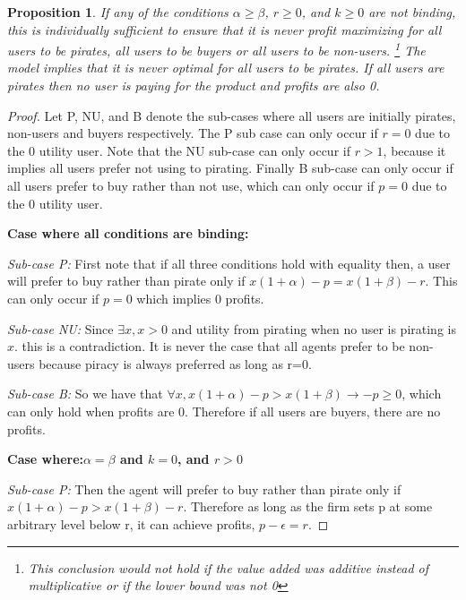 \documentclass{article}
\newtheorem{proposition}{Proposition}
\begin{document}
\begin{proposition}
\label{p1}
If any of the conditions $\alpha \geq \beta$, $r \geq 0$, and $k \geq 0$ are not binding, this is individually sufficient to ensure that it is never profit maximizing for all users to be pirates, all users to be buyers or all users to be non-users. \footnote{This conclusion would not hold if the value added was additive instead of multiplicative or if the lower bound was not 0} The model implies that it is never optimal for all users to be pirates. If all users are pirates then no user is paying for the product and profits are also 0. 
\end{proposition}

\begin{proof}
Let P, NU, and B denote the sub-cases where all users are initially pirates, non-users and buyers respectively. The P sub case can only occur if $r=0$ due to the 0 utility user.  Note that the NU sub-case can only occur if $r>1$, because it implies all users prefer not using to pirating. Finally B sub-case can only occur if all users prefer to buy rather than not use, which can only occur if $p=0$ due to the 0 utility user. 

\textbf{Case where all conditions are binding:}

\textit{Sub-case P:} First note that if all three conditions hold with equality then, a user will prefer to buy rather than pirate only if $x(1+\alpha)-p=x(1+\beta)-r$. This can only occur if $p = 0$ which implies 0 profits. 

\textit{Sub-case NU:} Since $\exists x,  x>0$ and utility from pirating when no user is pirating is $x$. this is a contradiction. It is never the case that all agents prefer to be non-users because piracy is always preferred as long as r=0.  

\textit{Sub-case B:} So we have that $ \forall x, x(1+\alpha)-p>x(1+\beta) \rightarrow -p \geq 0$, which can only hold when profits are 0. Therefore if all users are buyers, there are no profits. 

\textbf{Case where:$\alpha = \beta$ and $k = 0$, and $r>0$ }


\textit{Sub-case P:}  Then the agent will prefer to buy rather than pirate only if $x(1+\alpha)-p>x(1+\beta)-r$. Therefore as long as the firm sets p at some arbitrary level below r, it can achieve profits, $p-\epsilon=r$. 


\end{proof}
\end{document}
